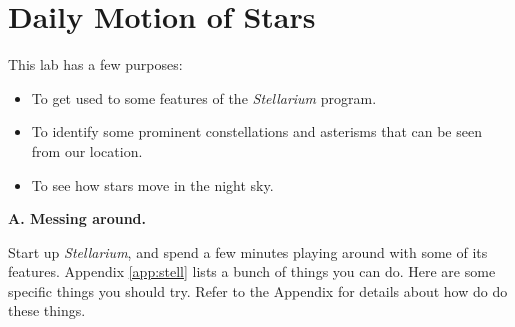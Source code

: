 \setcounter{chapter}{3}
\setcounter{page}{14}
\chapter{Daily Motion of Stars}

This lab has a few purposes:
\begin{itemize}
\item To get used to some features of the {\it Stellarium}
program.
\item To identify some prominent constellations and asterisms
that can be seen from our location.
\item To see how stars move in the night sky.
\end{itemize}

\bigskip

{\bf A. Messing around.}

Start up {\it Stellarium}, and spend a few minutes playing around with
some of its features. Appendix \ref{app:stell} lists a bunch of things
you can do. Here are some specific things you should try. Refer
to the Appendix for details about how do do these things.

